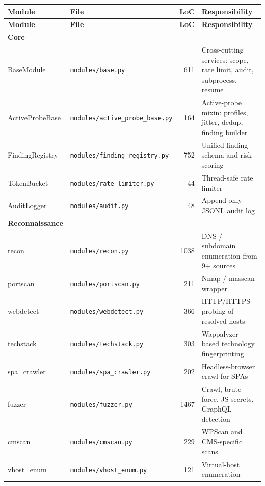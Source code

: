 \begingroup
\scriptsize
\begin{longtable}{|l|l|r|p{5.6cm}|}
\hline
\textbf{Module} & \textbf{File} & \textbf{LoC} & \textbf{Responsibility} \\
\hline
\endfirsthead
\hline
\textbf{Module} & \textbf{File} & \textbf{LoC} & \textbf{Responsibility} \\
\hline
\endhead
\textbf{Core} & & & \\
BaseModule              & \texttt{modules/base.py}                   & 611 & Cross-cutting services: scope, rate limit, audit, subprocess, resume \\
ActiveProbeBase         & \texttt{modules/active\_probe\_base.py}    & 164 & Active-probe mixin: profiles, jitter, dedup, finding builder \\
FindingRegistry         & \texttt{modules/finding\_registry.py}      & 752 & Unified finding schema and risk scoring \\
TokenBucket             & \texttt{modules/rate\_limiter.py}          &  44 & Thread-safe rate limiter \\
AuditLogger             & \texttt{modules/audit.py}                  &  48 & Append-only JSONL audit log \\
\hline
\textbf{Reconnaissance} & & & \\
recon                   & \texttt{modules/recon.py}                  & 1038 & DNS / subdomain enumeration from 9+ sources \\
portscan                & \texttt{modules/portscan.py}               &  211 & Nmap / masscan wrapper \\
webdetect               & \texttt{modules/webdetect.py}              &  366 & HTTP/HTTPS probing of resolved hosts \\
techstack               & \texttt{modules/techstack.py}              &  303 & Wappalyzer-based technology fingerprinting \\
spa\_crawler            & \texttt{modules/spa\_crawler.py}           &  202 & Headless-browser crawl for SPAs \\
fuzzer                  & \texttt{modules/fuzzer.py}                 & 1467 & Crawl, brute-force, JS secrets, GraphQL detection \\
cmscan                  & \texttt{modules/cmscan.py}                 &  229 & WPScan and CMS-specific scans \\
vhost\_enum             & \texttt{modules/vhost\_enum.py}            &  121 & Virtual-host enumeration \\

\end{longtable}
